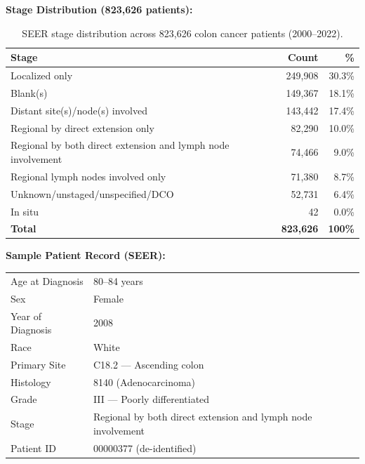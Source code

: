 \documentclass[11pt, a4paper]{article}
\begin{document}
\vspace{6pt}
\noindent\textbf{Stage Distribution (823,626 patients):}
\vspace{4pt}

\begin{table}[H]
\centering
\renewcommand{\arraystretch}{1.3}
\begin{tabular}{lrr}
\toprule
\textbf{Stage} & \textbf{Count} & \textbf{\%} \\
\midrule
Localized only                                               & 249,908 & 30.3\% \\
Blank(s)                                                     & 149,367 & 18.1\% \\
Distant site(s)/node(s) involved                             & 143,442 & 17.4\% \\
Regional by direct extension only                            &  82,290 & 10.0\% \\
Regional by both direct extension and lymph node involvement &  74,466 &  9.0\% \\
Regional lymph nodes involved only                           &  71,380 &  8.7\% \\
Unknown/unstaged/unspecified/DCO                             &  52,731 &  6.4\% \\
In situ                                                      &      42 &  0.0\% \\
\midrule
\textbf{Total}                                               & \textbf{823,626} & \textbf{100\%} \\
\bottomrule
\end{tabular}
\caption{SEER stage distribution across 823,626 colon cancer patients (2000--2022).}
\end{table}

\vspace{6pt}
\noindent\textbf{Sample Patient Record (SEER):}

\begin{samplebox}
\begin{tabular}{ll}
Age at Diagnosis  & 80--84 years \\
Sex               & Female \\
Year of Diagnosis & 2008 \\
Race              & White \\
Primary Site      & C18.2 --- Ascending colon \\
Histology         & 8140 (Adenocarcinoma) \\
Grade             & III --- Poorly differentiated \\
Stage             & Regional by both direct extension and lymph node involvement \\
Patient ID        & 00000377 (de-identified) \\
\end{tabular}
\end{samplebox}
\end{document}
